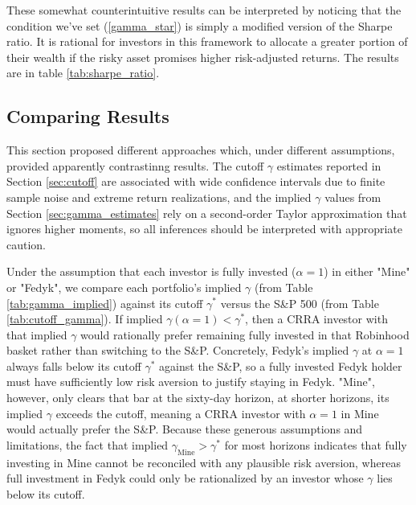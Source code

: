 These somewhat counterintuitive results can be interpreted by noticing that the condition we've set (\ref{gamma_star}) is simply a modified version of the Sharpe ratio.
It is rational for investors in this framework to allocate a greater portion of their wealth if the risky asset promises higher risk-adjusted returns.
The results are in table \ref{tab:sharpe_ratio}.

\subsection{Comparing Results}
This section proposed different approaches which, under different assumptions, provided apparently contrastinng results.   
The cutoff $\gamma$ estimates reported in Section \ref{sec:cutoff} are associated with wide confidence intervals due to finite sample noise and extreme return realizations, 
and the implied $\gamma$ values from Section \ref{sec:gamma_estimates} rely on a second-order Taylor approximation that ignores higher moments, so all inferences should be interpreted with appropriate caution.  

Under the assumption that each investor is fully invested ($\alpha= 1$) in either "Mine" or "Fedyk", we compare each portfolio's implied $\gamma$ (from Table \ref{tab:gamma_implied}) against its cutoff $\gamma^*$ versus the S\&P 500 (from Table \ref{tab:cutoff_gamma}). 
If implied $\gamma(\alpha=1) < \gamma^*$, then a CRRA investor with that implied $\gamma$ would rationally prefer remaining fully invested in that Robinhood basket rather than switching to the S\&P. 
Concretely, Fedyk's implied $\gamma$ at $\alpha=1$ always falls below its cutoff $\gamma^*$ against the S\&P, so a fully invested Fedyk holder must have sufficiently low risk aversion to justify staying in Fedyk. 
"Mine", however, only clears that bar at the sixty-day horizon, at shorter horizons, its implied $\gamma$ exceeds the cutoff, meaning a CRRA investor with $\alpha=1$ in Mine would actually prefer the S\&P. 
Because these generous assumptions and limitations, the fact that implied $\gamma_{\mathrm{Mine}} > \gamma^*$ for most horizons indicates that fully investing in Mine cannot be reconciled with any plausible risk aversion, 
whereas full investment in Fedyk could only be rationalized by an investor whose $\gamma$ lies below its cutoff.

